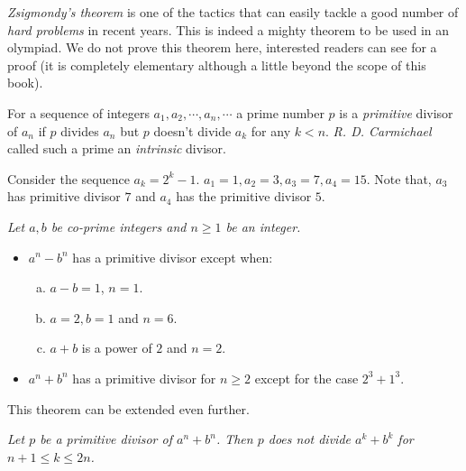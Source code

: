 \documentclass{subfile}
\begin{document}
	\textit{Zsigmondy's theorem} is one of the tactics that can easily tackle a good number of \textit{hard problems} in recent years. This is indeed a mighty theorem to be used in an olympiad. We do not prove this theorem here, interested readers can see \textcite[$\S6.2$]{billal_riasat_2021} for a proof (it is completely elementary although a little beyond the scope of this book).
		\begin{definition}
			For a sequence of integers $a_1,a_2,\cdots,a_n,\cdots$ a prime number $p$ is a \textit{primitive} divisor of $a_n$ if $p$ divides $a_n$ but $p$ doesn't divide $a_k$ for any $k<n$. \textit{R. D. Carmichael} called such a prime an \textit{intrinsic} divisor.
		\end{definition}

		\begin{example}
			Consider the sequence $a_k=2^k-1$. $a_1=1,a_2=3,a_3=7,a_4=15$. Note that, $a_3$ has primitive divisor $7$ and $a_4$ has the primitive divisor $5$.
		\end{example}

		\begin{theorem}\slshape
			Let $a,b$ be co-prime integers and $n\geq1$ be an integer.
				\begin{itemize}
					\item $a^n-b^n$ has a primitive divisor except when:
						\begin{enumerate}[(a)]
							\item $a-b=1$, $n=1$.
							\item $a=2,b=1$ and $n=6$.
							\item $a+b$ is a power of $2$ and $n=2$.
						\end{enumerate}
					\item $a^n+b^n$ has a primitive divisor for $n\geq2$ except for the case $2^3+1^3$.
				\end{itemize}\label{thm:zsigmondy}
		\end{theorem}
	This theorem can be extended even further.
		\begin{theorem}\slshape
			Let $p$ be a primitive divisor of $a^n+b^n$. Then $p$ does not divide $a^k+b^k$ for $n+1\leq k\leq2n$.
		\end{theorem}
\end{document}

